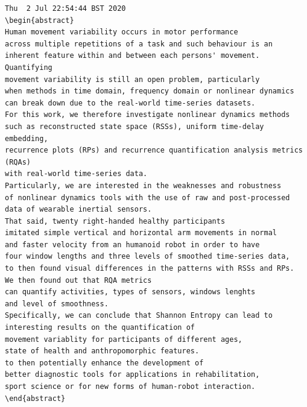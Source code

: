 \documentclass[10pt]{article}
\begin{document}
\begin{enumerate}
\begin{verbatim}
Thu  2 Jul 22:54:44 BST 2020
\begin{abstract}
Human movement variability occurs in motor performance 
across multiple repetitions of a task and such behaviour is an
inherent feature within and between each persons' movement. Quantifying
movement variability is still an open problem, particularly 
when methods in time domain, frequency domain or nonlinear dynamics 
can break down due to the real-world time-series datasets. 
For this work, we therefore investigate nonlinear dynamics methods 
such as reconstructed state space (RSSs), uniform time-delay embedding, 
recurrence plots (RPs) and recurrence quantification analysis metrics (RQAs)
with real-world time-series data.
Particularly, we are interested in the weaknesses and robustness 
of nonlinear dynamics tools with the use of raw and post-processed 
data of wearable inertial sensors. 
That said, twenty right-handed healthy participants 
imitated simple vertical and horizontal arm movements in normal 
and faster velocity from an humanoid robot in order to have 
four window lengths and three levels of smoothed time-series data,
to then found visual differences in the patterns with RSSs and RPs. 
We then found out that RQA metrics
can quantify activities, types of sensors, windows lenghts 
and level of smoothness. 
Specifically, we can conclude that Shannon Entropy can lead to 
interesting results on the quantification of 
movement variablity for participants of different ages, 
state of health and anthropomorphic features.
to then potentially enhance the development of 
better diagnostic tools for applications in rehabilitation, 
sport science or for new forms of human-robot interaction.
\end{abstract}



\end{verbatim}
\end{enumerate}
\end{document}
